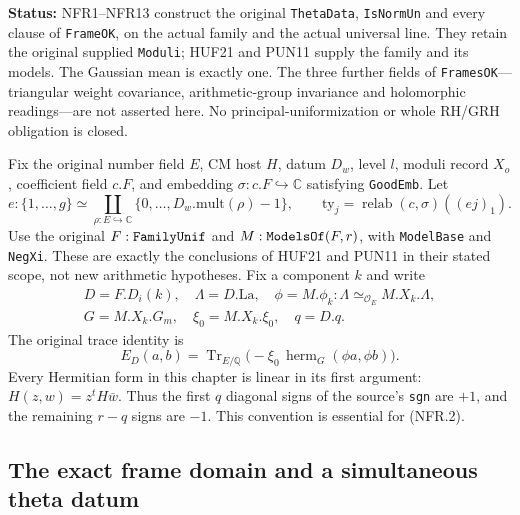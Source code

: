 \documentclass[11pt,a4paper]{article}
\numberwithin{equation}{section}
\theoremstyle{remark}\newtheorem{remark}[theorem]{Remark}
\newcommand{\status}[1]{\textbf{Status:} #1}
\begin{document}
\status{NFR1--NFR13 construct the original \texttt{Theta\allowbreak Data},
\texttt{Is\allowbreak Norm\allowbreak Un} and every clause of \texttt{Frame\allowbreak OK}, on the actual
family and the actual universal line.  They retain the original supplied
\texttt{Moduli}; HUF21 and PUN11 supply the family and its models.
The Gaussian mean is exactly one.  The three further fields of
\texttt{Frames\allowbreak OK}---triangular weight covariance, arithmetic-group
invariance and holomorphic readings---are not asserted here.
No principal-uniformization or whole RH/GRH obligation is closed.}

Fix the original number field $E$, CM host $H$, datum $D_w$, level $l$,
moduli record $X_o$, coefficient field $c.F$, and embedding
$\sigma:c.F\hookrightarrow\mathbb C$ satisfying \texttt{Good\allowbreak Emb}.
Let
\[
 e:\{1,\ldots,g\}\simeq
       \coprod_{\rho:E\hookrightarrow\mathbb C}\{0,\ldots,D_w.\mathrm{mult}(\rho)-1\},
 \qquad \mathrm{ty}_j=\operatorname{relab}(c,\sigma)((ej)_1).
 \tag{NFR.1}
\]
Use the original $F:\texttt{Family\allowbreak Unif}$ and
$M:\texttt{Models\allowbreak Of}(F,r)$, with \texttt{Model\allowbreak Base} and \texttt{Neg\allowbreak Xi}.
These are exactly the conclusions of HUF21 and PUN11 in their stated
scope, not new arithmetic hypotheses.  Fix a component $k$ and write
\[
\begin{gathered}
D=F.D_i(k),\quad \Lambda=D.\mathrm{La},\quad
\phi=M.\phi_k:\Lambda\simeq_{\mathcal O_E}M.X_k.\Lambda,\\
G=M.X_k.G_m,\quad \xi_0=M.X_k.\xi_0,\quad q=D.q.
\end{gathered}
\]
The original trace identity is
\[
 E_D(a,b)=\operatorname{Tr}_{E/\mathbb Q}
                  \bigl(-\xi_0\,\operatorname{herm}_G(\phi a,\phi b)\bigr).
 \tag{NFR.2}
\]
Every Hermitian form in this chapter is linear in its first argument:
$H(z,w)=z^tH\overline w$.  Thus the first $q$ diagonal signs of
the source's \texttt{sgn} are $+1$, and the remaining $r-q$ signs
are $-1$.  This convention is essential for (NFR.2).

\subsection{The exact frame domain and a simultaneous theta datum}

\end{document}
